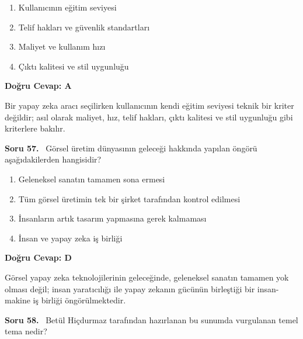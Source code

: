 \documentclass[11pt,a4paper,openany]{book}
\begin{document}
\begin{enumerate}[label=\Alph*), leftmargin=25pt, topsep=4pt, itemsep=2pt]
        \item Kullanıcının eğitim seviyesi
        \item Telif hakları ve güvenlik standartları
        \item Maliyet ve kullanım hızı
        \item Çıktı kalitesi ve stil uygunluğu
\end{enumerate}

\vspace{4pt}
\begin{tcolorbox}[title=Cevap ve Açıklama, colback=gray!3!white, colframe=primarycolor!90!black, arc=2mm, fonttitle=\bfseries\sffamily, top=6pt, bottom=6pt]
    \textbf{Doğru Cevap: A}

    \vspace{2pt}
    Bir yapay zeka aracı seçilirken kullanıcının kendi eğitim seviyesi teknik bir kriter değildir; asıl olarak maliyet, hız, telif hakları, çıktı kalitesi ve stil uygunluğu gibi kriterlere bakılır.
\end{tcolorbox}
\vspace{10pt}
\needspace{5cm}
\vspace{8pt}
\noindent\textbf{\large\sffamily Soru 57.} \ Görsel üretim dünyasının geleceği hakkında yapılan öngörü aşağıdakilerden hangisidir?

\begin{enumerate}[label=\Alph*), leftmargin=25pt, topsep=4pt, itemsep=2pt]
        \item Geleneksel sanatın tamamen sona ermesi
        \item Tüm görsel üretimin tek bir şirket tarafından kontrol edilmesi
        \item İnsanların artık tasarım yapmasına gerek kalmaması
        \item İnsan ve yapay zeka iş birliği
\end{enumerate}

\vspace{4pt}
\begin{tcolorbox}[title=Cevap ve Açıklama, colback=gray!3!white, colframe=primarycolor!90!black, arc=2mm, fonttitle=\bfseries\sffamily, top=6pt, bottom=6pt]
    \textbf{Doğru Cevap: D}

    \vspace{2pt}
    Görsel yapay zeka teknolojilerinin geleceğinde, geleneksel sanatın tamamen yok olması değil; insan yaratıcılığı ile yapay zekanın gücünün birleştiği bir insan-makine iş birliği öngörülmektedir.
\end{tcolorbox}
\vspace{10pt}
\needspace{5cm}
\vspace{8pt}
\noindent\textbf{\large\sffamily Soru 58.} \ Betül Hiçdurmaz tarafından hazırlanan bu sunumda vurgulanan temel tema nedir?
\end{document}
